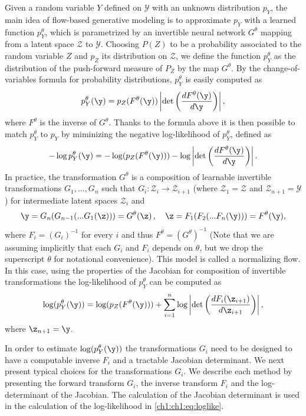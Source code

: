 Given a random variable $Y$ defined on $\mathcal{Y}$ with an unknown distribution $p_Y$, the main idea of flow-based generative modeling is to approximate $p_Y$ with a learned function $p^\theta_Y$, which is parametrized by an invertible neural network $G^\theta$ mapping from a latent space $\mathcal{Z}$ to $\mathcal{Y}$. 
Choosing $P(Z)$ to be a probability associated to the random variable $Z$ and $p_Z$ its distribution on $\mathcal{Z}$, we define the function $p^\theta_Y$ as the distribution of the push-forward measure of $P_Z$ by the map $G^\theta$.
By the change-of-variables formula for probability distributions, $p^\theta_Y$ is easily computed as
\begin{align*}
p^\theta_Y(\y) = p_Z(F^\theta(\y)) \left| \det \left(\frac{d F^\theta(\y)}{d\y} \right)\right|,
\end{align*}
where $F^\theta$ is the inverse of $G^\theta$.
Thanks to the formula above it is then possible to match $p^\theta_Y$ to $p_Y$ by miminizing the negative log-likelihood of $p^\theta_Y$, defined as
\begin{align*}
- \log p^\theta_Y(\y) = -  \log(p_Z(F^\theta(\y))) -  \log\left| \det \left(\frac{d F^\theta(\y)}{d\y} \right)\right|.
\end{align*}
In practice, the transformation $G^\theta$ is a composition of learnable invertible transformations $G_{1}, ..., G_{n}$ such that $G_i : \mathcal{Z}_{i} \rightarrow \mathcal{Z}_{i+1}$ (where $\mathcal{Z}_1 = \mathcal{Z}$ and $\mathcal{Z}_{n+1} = \mathcal{Y}$) for intermediate latent spaces $\mathcal{Z}_i$ and
\begin{equation}
    \y = G_{n}(G_{n-1}(...G_{1}(\z)))=G^{\theta}(\z)\,, \quad  \z= F_1(F_{2}(...F_n(\y)))=F^{\theta}(\y),
\end{equation}
where $F_i = (G_i)^{-1}$ for every $i$ and thus $F^\theta = (G^\theta)^{-1}$ (Note that we are assuming implicitly that each $G_i$ and $F_i$ depends on $\theta$, but we drop the superscript $\theta$ for notational convenience). This model is called a normalizing flow.
In this case, using the properties of the Jacobian for composition of invertible transformations the log-likelihood of $p^\theta_Y$ can be computed as 
\begin{equation}\label{ch1:ch1:eq:loglike}
\log(p^\theta_Y(\y) ) = \log(p_Z(F^\theta(\y))) + \sum_{i=1}^{n}  \log\left| \det \left(\frac{d{F_i}(\z_{i+1})}{d\z_{i+1}} \right)\right|,
\end{equation}
where $\z_{n+1} = \y$.


In order to estimate $\log(p^\theta_Y(\y) )$ the transformations $G_i$ need to be designed to have a computable inverse $F_i$ and a tractable Jacobian determinant. 
We next present typical choices for the transformations $G_i$. We describe each method by presenting the forward transform $G_i$, the inverse transform $F_i$ and the  log-determinant of the Jacobian. The calculation of the Jacobian determinant is used in the calculation of the log-likelihood in \eqref{ch1:ch1:eq:loglike}.
\color{black}

